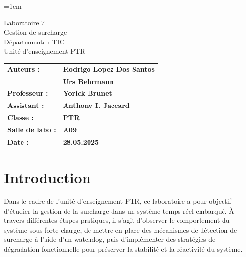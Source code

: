 \documentclass[a4paper,12pt]{article}
\author{Urs Behrmann}
\begin{document}
\emergencystretch=1em %

\thispagestyle{firstpage}


\vspace*{2cm}
\begin{center}
    \Huge Laboratoire 7 \\
    \vspace{0.2cm}
    \Large Gestion de surcharge\\
    \vspace{1cm}
    \small Départements : TIC\\
    Unité d'enseignement PTR\\
\end{center}

\vspace{9cm}

\renewcommand{\arraystretch}{1.5} %

\begin{flushleft} %
    \begin{tabular}{@{}l l@{}}
        \textbf{Auteurs :}       & \textbf{Rodrigo Lopez Dos Santos} \\
                                 & \textbf{Urs Behrmann} \\
        \textbf{Professeur :}    & \textbf{Yorick Brunet} \\
        \textbf{Assistant :}     & \textbf{Anthony I. Jaccard} \\
        \textbf{Classe :}        & \textbf{PTR} \\
        \textbf{Salle de labo :} & \textbf{A09} \\
        \textbf{Date :}          & \textbf{28.05.2025} 
    \end{tabular}
\end{flushleft}

\newpage

\pagestyle{otherpages}

\tableofcontents

\newpage

\section{Introduction}

Dans le cadre de l'unité d'enseignement PTR, ce laboratoire a pour objectif d'étudier la gestion de la surcharge dans un système temps réel embarqué. À travers différentes étapes pratiques, il s'agit d'observer le comportement du système sous forte charge, de mettre en place des mécanismes de détection de surcharge à l'aide d'un watchdog, puis d'implémenter des stratégies de dégradation fonctionnelle pour préserver la stabilité et la réactivité du système.
\end{document}
